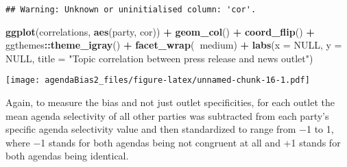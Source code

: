 \documentclass[]{article}
\newenvironment{Shaded}{\begin{snugshade}}{\end{snugshade}}
\newcommand{\KeywordTok}[1]{\textcolor[rgb]{0.13,0.29,0.53}{\textbf{#1}}}
\newcommand{\DataTypeTok}[1]{\textcolor[rgb]{0.13,0.29,0.53}{#1}}
\newcommand{\StringTok}[1]{\textcolor[rgb]{0.31,0.60,0.02}{#1}}
\newcommand{\OtherTok}[1]{\textcolor[rgb]{0.56,0.35,0.01}{#1}}
\newcommand{\OperatorTok}[1]{\textcolor[rgb]{0.81,0.36,0.00}{\textbf{#1}}}
\newcommand{\NormalTok}[1]{#1}
\begin{document}
\begin{verbatim}
## Warning: Unknown or uninitialised column: 'cor'.
\end{verbatim}

\begin{Shaded}
\begin{Highlighting}[]
\KeywordTok{ggplot}\NormalTok{(correlations, }\KeywordTok{aes}\NormalTok{(party, cor)) }\OperatorTok{+}
\StringTok{  }\KeywordTok{geom_col}\NormalTok{() }\OperatorTok{+}
\StringTok{  }\KeywordTok{coord_flip}\NormalTok{() }\OperatorTok{+}
\StringTok{  }\NormalTok{ggthemes}\OperatorTok{::}\KeywordTok{theme_igray}\NormalTok{() }\OperatorTok{+}
\StringTok{  }\KeywordTok{facet_wrap}\NormalTok{(}\OperatorTok{~}\NormalTok{medium) }\OperatorTok{+}
\StringTok{  }\KeywordTok{labs}\NormalTok{(}\DataTypeTok{x =} \OtherTok{NULL}\NormalTok{, }\DataTypeTok{y =} \OtherTok{NULL}\NormalTok{, }\DataTypeTok{title =} \StringTok{"Topic correlation between press release and news outlet"}\NormalTok{)}
\end{Highlighting}
\end{Shaded}

\texttt{[image: agendaBias2\_files/figure-latex/unnamed-chunk-16-1.pdf]}

Again, to measure the bias and not just outlet specificities, for each
outlet the mean agenda selectivity of all other parties was subtracted
from each party's specific agenda selectivity value and then
standardized to range from −1 to 1, where −1 stands for both agendas
being not congruent at all and +1 stands for both agendas being
identical.

\begin{Shaded}
\end{Shaded}
\end{document}
